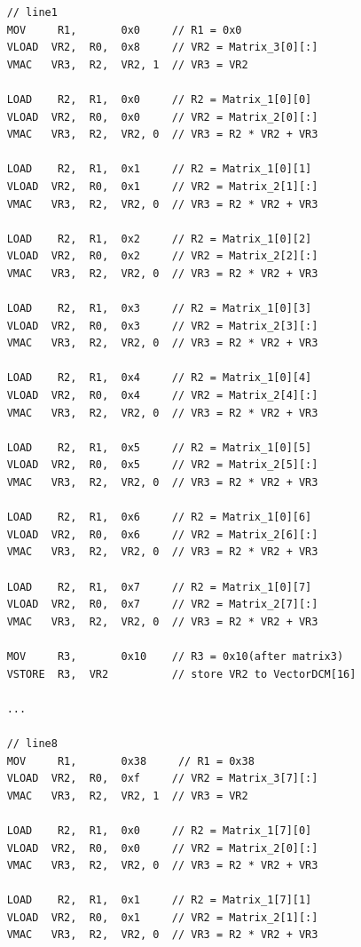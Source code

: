 \documentclass[UTF8]{ctexart}
\begin{document}
\begin{lstlisting}
    // line1
    MOV     R1,       0x0     // R1 = 0x0
    VLOAD  VR2,  R0,  0x8     // VR2 = Matrix_3[0][:]
    VMAC   VR3,  R2,  VR2, 1  // VR3 = VR2

    LOAD    R2,  R1,  0x0     // R2 = Matrix_1[0][0]
    VLOAD  VR2,  R0,  0x0     // VR2 = Matrix_2[0][:]
    VMAC   VR3,  R2,  VR2, 0  // VR3 = R2 * VR2 + VR3

    LOAD    R2,  R1,  0x1     // R2 = Matrix_1[0][1]
    VLOAD  VR2,  R0,  0x1     // VR2 = Matrix_2[1][:]
    VMAC   VR3,  R2,  VR2, 0  // VR3 = R2 * VR2 + VR3

    LOAD    R2,  R1,  0x2     // R2 = Matrix_1[0][2]
    VLOAD  VR2,  R0,  0x2     // VR2 = Matrix_2[2][:]
    VMAC   VR3,  R2,  VR2, 0  // VR3 = R2 * VR2 + VR3

    LOAD    R2,  R1,  0x3     // R2 = Matrix_1[0][3]
    VLOAD  VR2,  R0,  0x3     // VR2 = Matrix_2[3][:]
    VMAC   VR3,  R2,  VR2, 0  // VR3 = R2 * VR2 + VR3

    LOAD    R2,  R1,  0x4     // R2 = Matrix_1[0][4]
    VLOAD  VR2,  R0,  0x4     // VR2 = Matrix_2[4][:]
    VMAC   VR3,  R2,  VR2, 0  // VR3 = R2 * VR2 + VR3

    LOAD    R2,  R1,  0x5     // R2 = Matrix_1[0][5]
    VLOAD  VR2,  R0,  0x5     // VR2 = Matrix_2[5][:]
    VMAC   VR3,  R2,  VR2, 0  // VR3 = R2 * VR2 + VR3

    LOAD    R2,  R1,  0x6     // R2 = Matrix_1[0][6]
    VLOAD  VR2,  R0,  0x6     // VR2 = Matrix_2[6][:]
    VMAC   VR3,  R2,  VR2, 0  // VR3 = R2 * VR2 + VR3

    LOAD    R2,  R1,  0x7     // R2 = Matrix_1[0][7]
    VLOAD  VR2,  R0,  0x7     // VR2 = Matrix_2[7][:]
    VMAC   VR3,  R2,  VR2, 0  // VR3 = R2 * VR2 + VR3

    MOV     R3,       0x10    // R3 = 0x10(after matrix3)
    VSTORE  R3,  VR2          // store VR2 to VectorDCM[16]

    ...

    // line8
    MOV     R1,       0x38     // R1 = 0x38
    VLOAD  VR2,  R0,  0xf     // VR2 = Matrix_3[7][:]
    VMAC   VR3,  R2,  VR2, 1  // VR3 = VR2

    LOAD    R2,  R1,  0x0     // R2 = Matrix_1[7][0]
    VLOAD  VR2,  R0,  0x0     // VR2 = Matrix_2[0][:]
    VMAC   VR3,  R2,  VR2, 0  // VR3 = R2 * VR2 + VR3

    LOAD    R2,  R1,  0x1     // R2 = Matrix_1[7][1]
    VLOAD  VR2,  R0,  0x1     // VR2 = Matrix_2[1][:]
    VMAC   VR3,  R2,  VR2, 0  // VR3 = R2 * VR2 + VR3


\end{lstlisting}
\end{document}
